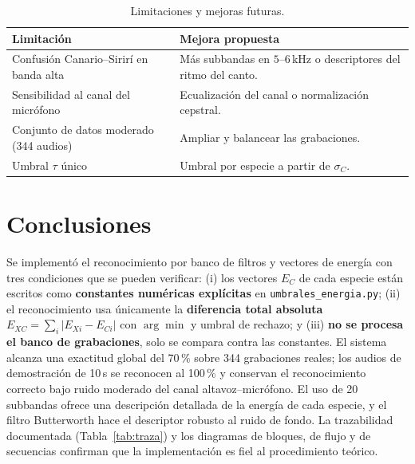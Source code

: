 \documentclass[conference]{IEEEtran}
\begin{document}
\begin{table}[!t]
\caption{Limitaciones y mejoras futuras.}
\label{tab:limitaciones}
\centering
\renewcommand{\arraystretch}{1.2}
\begin{tabularx}{\columnwidth}{@{}X X@{}}
\toprule
\textbf{Limitación} & \textbf{Mejora propuesta} \\
\midrule
Confusión Canario--Sirirí en banda alta & Más subbandas en $5$--$6$\,kHz o
descriptores del ritmo del canto. \\
Sensibilidad al canal del micrófono & Ecualización del canal o normalización
cepstral. \\
Conjunto de datos moderado (344 audios) & Ampliar y balancear las grabaciones. \\
Umbral $\tau$ único & Umbral por especie a partir de $\sigma_C$. \\
\bottomrule
\end{tabularx}
\end{table}

\section{Conclusiones}\label{sec:conclusiones}
Se implementó el reconocimiento por banco de filtros y vectores de energía con
tres condiciones que se pueden verificar: (i) los vectores $E_C$ de cada especie
están escritos como \textbf{constantes numéricas explícitas} en
\texttt{umbrales\_energia.py}; (ii) el reconocimiento usa únicamente la
\textbf{diferencia total absoluta} $E_{XC}=\sum_i\lvert E_{Xi}-E_{Ci}\rvert$ con
$\arg\min$ y umbral de rechazo; y (iii) \textbf{no se procesa el banco de
grabaciones}, solo se compara contra las constantes. El sistema alcanza una
exactitud global del 70\,\% sobre 344 grabaciones reales; los audios de
demostración de 10\,s se reconocen al 100\,\% y conservan el reconocimiento
correcto bajo ruido moderado del canal altavoz--micrófono. El uso de 20 subbandas
ofrece una descripción detallada de la energía de cada especie, y el filtro
Butterworth hace el descriptor robusto al ruido de fondo. La trazabilidad
documentada (Tabla~\ref{tab:traza}) y los diagramas de bloques, de flujo y de
secuencias confirman que la implementación es fiel al procedimiento teórico.
\end{document}

